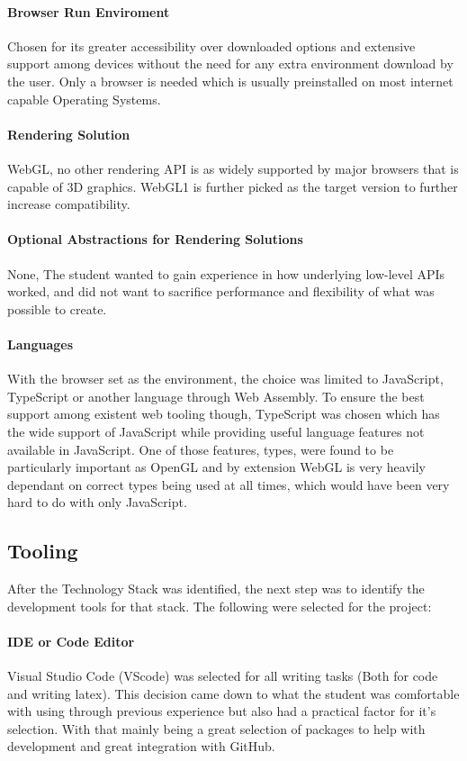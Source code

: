 \paragraph{Browser Run Enviroment}
Chosen for its greater accessibility over downloaded options and extensive support among devices without the need for any extra environment download by the user. Only a browser is needed which is usually preinstalled on most internet capable Operating Systems.

\paragraph{Rendering Solution}
WebGL, no other rendering API is as widely supported by major browsers that is capable of 3D graphics. WebGL1 is further picked as the target version to further increase compatibility.

\paragraph{Optional Abstractions for Rendering Solutions}
None, The student wanted to gain experience in how underlying low-level APIs worked, and did not want to sacrifice performance and flexibility of what was possible to create.

\paragraph{Languages}
With the browser set as the environment, the choice was limited to JavaScript, TypeScript or another language through Web Assembly. To ensure the best support among existent web tooling though, TypeScript was chosen which has the wide support of JavaScript while providing useful language features not available in JavaScript. One of those features, types, were found to be particularly important as OpenGL and by extension WebGL is very heavily dependant on correct types being used at all times, which would have been very hard to do with only JavaScript.

\subsection{Tooling}
After the Technology Stack was identified, the next step was to identify the development tools for that stack. The following were selected for the project:

\paragraph{IDE or Code Editor}
Visual Studio Code (VScode) was selected for all writing tasks (Both for code and writing latex). This decision came down to what the student was comfortable with using through previous experience but also had a practical factor for it's selection. With that mainly being a great selection of packages to help with development and great integration with GitHub.

